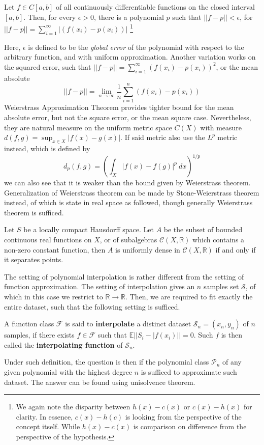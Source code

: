 \documentclass[10pt]{article} %
\begin{document}
\begin{theorem}
    Let $f\in C[a,b]$ of all continuously differentiable functions on the closed interval $[a,b]$. Then, for every $\epsilon > 0$, there is a polynomial $p$ such that $||f-p||< \epsilon$, for $||f-p||=\sum_{i=1}^{\infty}|(f(x_{i})-p(x_{i}))|$ \footnote{We again note the disparity between $h(x)-c(x)$ or $c(x)-h(x)$ for clarity. In essence, $c(x)-h(c)$ is looking from the perspective of the concept itself. While $h(x)-c(x)$ is comparison on difference from the perspective of the hypothesis.}
\end{theorem}
Here, $\epsilon$ is defined to be the \textit{global error} of the polynomial with respect to the arbitrary function, and with uniform approximation. Another variation works on the squared error, such that $||f-p||=\sum_{i=1}^{\infty}(f(x_{i})-p(x_{i}))^{2}$, or the mean absolute $$||f-p||=\lim_{n\to\infty}\frac{1}{n}\sum_{i=1}^{n}(f(x_{i})-p(x_{i}))$$
Weierstrass Approximation Theorem provides tighter bound for the mean absolute error, but not the square error, or the mean square case. Nevertheless, they are natural measure on the uniform metric space $C(X)$ with measure $d(f,g)=\sup_{x\in X}|f(x)-g(x)|$. If said metric also use the $L^{p}$ metric instead, which is defined by 
\begin{equation}
    d_{p}(f,g) = \left(\int_{X}|f(x)-f(g)|^{p}\:dx\right)^{1/p}
\end{equation}
we can also see that it is weaker than the bound given by Weierstrass theorem. Generalization of Weierstrass theorem can be made by Stone-Weierstrass theorem instead, of which is state in real space as followed, though generally Weierstrass theorem is sufficed.
\begin{theorem}
  Let $S$ be a locally compact Hausdorff space. Let $A$ be the subset of bounded continuous real functions on $X$, or of subalgebras $\mathcal{C}(X,\mathbb{R})$ which contains a non-zero constant function, then $A$ is uniformly dense in $\mathcal{C}(X,\mathbb{R})$ if and only if it separates points. 
\end{theorem}
The setting of polynomial interpolation is rather different from the setting of function approximation. The setting of interpolation gives an $n$ samples set $\mathcal{S}$, of which in this case we restrict to $\mathbb{R}\to\mathbb{R}$. Then, we are required to fit exactly the entire dataset, such that the following setting is sufficed. 
\begin{definition}[Interpolation]
    A function class $\mathcal{F}$ is said to \textbf{interpolate} a distinct dataset $\mathcal{S}_{n}=(x_{n},y_{n})$ of $n$ samples, if there exists $f\in \mathcal{F}$ such that $\mathbb{E}||S_{i}-|f(x_{i})||= 0$. Such $f$ is then called the \textbf{interpolating function} of $\mathcal{S}_{n}$. 
\end{definition}
Under such definition, the question is then if the polynomial class $\mathcal{P}_{n}$ of any given polynomial with the highest degree $n$ is sufficed to approximate such dataset. The answer can be found using unisolvence theorem.
\end{document}
